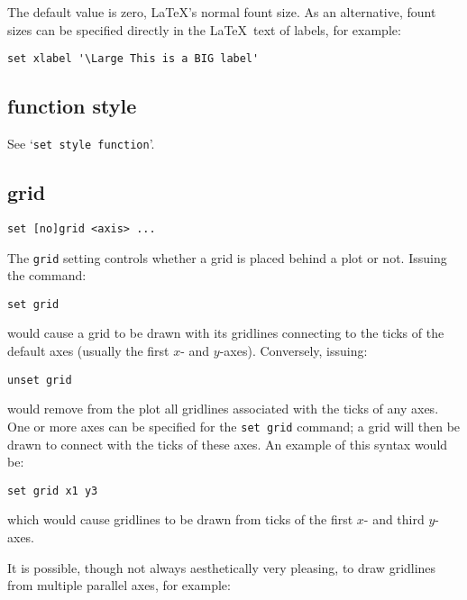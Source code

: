 The default value is zero, \LaTeX's normal fount size. As an alternative, fount
sizes can be specified directly in the \LaTeX\ text of labels, for example:

\begin{verbatim}
set xlabel '\Large This is a BIG label'
\end{verbatim}

\subsection{function style}

See `{\tt set style function}'.

\subsection{grid}

\begin{verbatim}
set [no]grid <axis> ...
\end{verbatim}

The {\tt grid} setting controls whether a grid is placed behind a plot or not.
Issuing the command:

\begin{verbatim}
set grid
\end{verbatim}

\noindent would cause a grid to be drawn with its gridlines connecting to the ticks of
the default axes (usually the first $x$- and $y$-axes). Conversely, issuing:

\begin{verbatim}
unset grid
\end{verbatim}

\noindent would remove from the plot all gridlines associated with the ticks of any axes.
One or more axes can be specified for the {\tt set grid} command; a grid will
then be drawn to connect with the ticks of these axes. An example of this syntax
would be:

\begin{verbatim}
set grid x1 y3
\end{verbatim}

\noindent which would cause gridlines to be drawn from ticks of the first $x$- and third
$y$-axes.

It is possible, though not always aesthetically very pleasing, to draw
gridlines from multiple parallel axes, for example:

